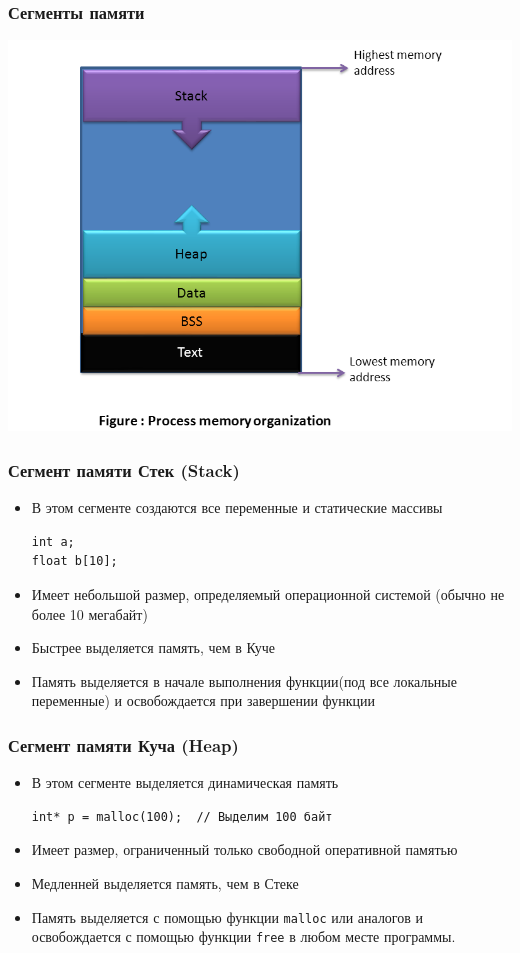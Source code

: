 \documentclass[10pt,pdf,hyperref={unicode}]{beamer}
\begin{document}
\begin{frame}[fragile]
\frametitle{Сегменты памяти}
\begin{center}
\includegraphics[width=0.86\linewidth]{../images/process_memory_organization.png}
\end{center}
\end{frame}


\begin{frame}[fragile]
\frametitle{Сегмент памяти Стек (Stack)}
\begin{itemize}
\item В этом сегменте создаются все переменные и статические массивы
\begin{lstlisting}
int a;
float b[10];
\end{lstlisting}
\item Имеет небольшой размер, определяемый операционной системой (обычно не более 10 мегабайт)
\item Быстрее выделяется память, чем в Куче
\item Память выделяется в начале выполнения функции(под все локальные переменные) и освобождается
при завершении функции
\end{itemize}
\end{frame}


\begin{frame}[fragile]
\frametitle{Сегмент памяти Куча (Heap)}
\begin{itemize}
\item В этом сегменте выделяется динамическая память
\begin{lstlisting}
int* p = malloc(100);  // Выделим 100 байт
\end{lstlisting}
\item Имеет размер, ограниченный только свободной оперативной памятью
\item Медленней выделяется память, чем в Стеке
\item Память выделяется с помощью функции \texttt{malloc} или аналогов и освобождается с помощью функции
\texttt{free} в любом месте программы.
\end{itemize}
\end{frame}
\end{document}
